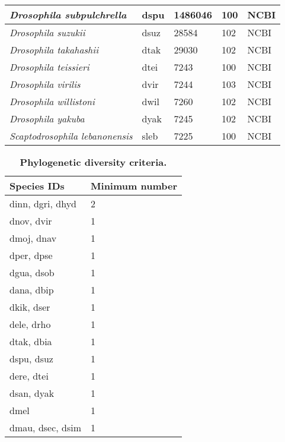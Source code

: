 \begin{table}[h!]
\begin{tabular}{|l|l|l|l|l|}
\textit{Drosophila subpulchrella}      & dspu                & 1486046           & 100              & NCBI            \\ \hline
\textit{Drosophila suzukii}            & dsuz                & 28584             & 102              & NCBI            \\ \hline
\textit{Drosophila takahashii}         & dtak                & 29030             & 102              & NCBI            \\ \hline
\textit{Drosophila teissieri}          & dtei                & 7243              & 100              & NCBI            \\ \hline
\textit{Drosophila virilis}            & dvir                & 7244              & 103              & NCBI            \\ \hline
\textit{Drosophila willistoni}         & dwil                & 7260              & 102              & NCBI            \\ \hline
\textit{Drosophila yakuba}             & dyak                & 7245              & 102              & NCBI            \\ \hline
\textit{Scaptodrosophila lebanonensis} & sleb                & 7225              & 100              & NCBI            \\ \hline
\end{tabular}
\end{table}

\begin{table}[h!]
\centering
\caption{\textbf{Phylogenetic diversity criteria.}}
\label{stable:diversity_criteria}
\begin{tabular}{|l|l|}
\hline
\textbf{Species IDs}   & \textbf{Minimum number}   \\ \hline
dinn,   dgri, dhyd     & 2                         \\ \hline
dnov,   dvir           & 1                         \\ \hline
dmoj,   dnav           & 1                         \\ \hline
dper,   dpse           & 1                         \\ \hline
dgua,   dsob           & 1                         \\ \hline
dana,   dbip           & 1                         \\ \hline
dkik,   dser           & 1                         \\ \hline
dele,   drho           & 1                         \\ \hline
dtak,   dbia           & 1                         \\ \hline
dspu,   dsuz           & 1                         \\ \hline
dere,   dtei           & 1                         \\ \hline
dsan,   dyak           & 1                         \\ \hline
dmel                   & 1                         \\ \hline
dmau,   dsec, dsim     & 1                         \\ \hline
\end{tabular}
\end{table}
